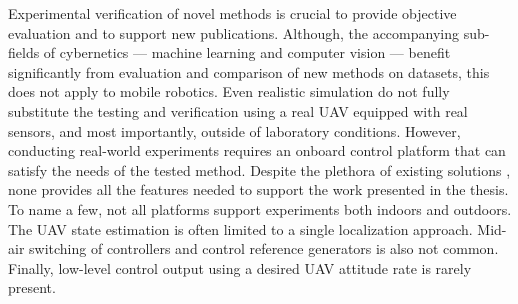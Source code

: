 \documentclass[a4paper,11pt,titlepage,twoside]{book}
\begin{document}
Experimental verification of novel methods is crucial to provide objective evaluation and to support new publications.
Although, the accompanying sub-fields of cybernetics --- machine learning and computer vision --- benefit significantly from evaluation and comparison of new methods on datasets, this does not apply to mobile robotics.
Even realistic simulation do not fully substitute the testing and verification using a real \ac{UAV} equipped with real sensors, and most importantly, outside of laboratory conditions.
However, conducting real-world experiments requires an onboard control platform that can satisfy the needs of the tested method.
Despite the plethora of existing solutions \cite{sanchez2016aerostack, xiao2020xtdrone, furrer2016rotors, schmittle2018openuav, abeywardena2015design, mellado2013mavwork}, none provides all the features needed to support the work presented in the thesis.
To name a few, not all platforms support experiments both indoors and outdoors.
The \ac{UAV} state estimation is often limited to a single localization approach.
Mid-air switching of controllers and control reference generators is also not common.
Finally, low-level control output using a desired \ac{UAV} attitude rate is rarely present.

\end{document}
